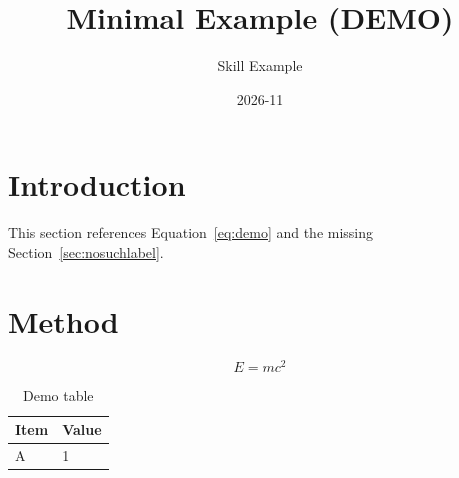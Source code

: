 \documentclass[11pt]{article}
\title{Minimal Example (DEMO)}
\author{Skill Example}
\date{2026-11}
\begin{document}
\maketitle

\section{Introduction}
This section references Equation~\eqref{eq:demo} and the missing Section~\ref{sec:nosuchlabel}.

\section{Method}
\begin{equation}
  E = m c^2
  \label{eq:demo}
\end{equation}

\begin{table}[htbp]
  \centering
  \caption{Demo table}
  \begin{tabular}{ll}
    \toprule
    Item & Value \\
    \midrule
    A & 1 \\
    \bottomrule
  \end{tabular}
\end{table}
\end{document}
